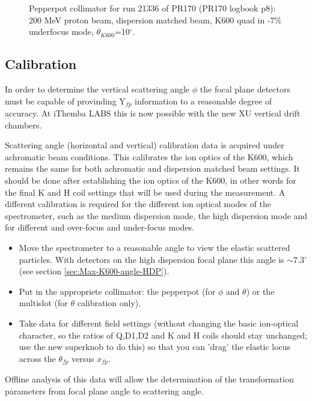 \documentclass[11pt]{report}
\begin{document}
\begin{figure}[!h]
\centerline{\vspace{0cm}\hspace{0cm}
}
\centering
\caption{Pepperpot collimator for run 21336 of PR170 (PR170 logbook p8): 200 MeV proton beam, dispersion
matched beam, K600 quad in -7\% underfocus mode, $\theta_{K600}$=10$^{\circ}$. }
\label{fig:pepperpot_pr170}
\end{figure} 


\subsection{Calibration}






In order to determine the vertical scattering angle $\phi$ the focal plane detectors must be 
capable of provinding Y$_{fp}$ information to a reasonable degree of accuracy. At iThemba LABS 
this is now possible with the new XU vertical drift chambers. 

Scattering angle (horizontal and vertical) calibration data is acquired under achromatic beam conditions.
This calibrates the ion optics of the K600, which remains the same for both achromatic and dispersion 
matched beam settings.
It should be done after establishing the ion optics of the K600, in other words for the final K and H coil settings 
that will be used during the measurement.
A different calibration is required for the different ion optical modes of the spectrometer, 
such as the medium dispersion mode, the high dispersion mode and for different and over-focus and under-focus modes.
%
\begin{itemize}
\item Move the spectrometer to a reasonable angle to view the elastic scattered
      particles. With detectors on the high dispersion focal plane this angle is $\sim$7.3$^{\circ}$ 
      (see section \ref{sec:Max-K600-angle-HDP}).
\item Put in the appropriete collimator: the pepperpot (for $\phi$ and $\theta$) 
      or the multislot (for $\theta$ calibration only).
\item Take data for different field settings (without changing the basic
      ion-optical character, so the ratios of Q,D1,D2 and K and H coils should stay unchanged; use the
      new superknob to do this) so that you can  'drag' the elastic locus across the $\theta_{fp}$ versus $x_{fp}$.       
\end{itemize}
%
Offline analysis of this data will allow the determination of the transformation parameters from focal plane angle
to scattering angle.
\end{document}
